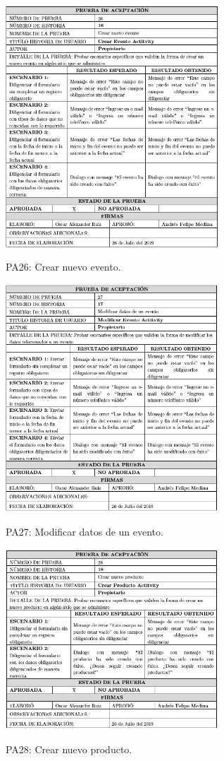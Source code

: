 \documentclass[12pt,letterpaper,openany]{book}
\begin{document}
\begin{table}[H]
\centering
\includegraphics[width=8cm]{./imagenes/PA/PA26}
\caption{PA26: Crear nuevo evento.}
\end{table}

\begin{table}[H]
\centering
\includegraphics[width=8cm]{./imagenes/PA/PA27}
\caption{PA27: Modificar datos de un evento.}
\end{table}

\begin{table}[H]
\centering
\includegraphics[width=8cm]{./imagenes/PA/PA28}
\caption{PA28: Crear nuevo producto.}
\end{table}
\end{document}
